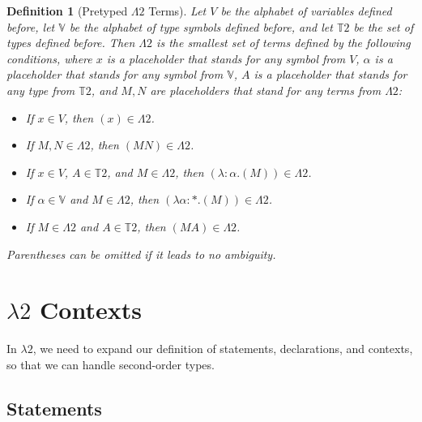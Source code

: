 \documentclass{book}
\numberwithin{equation}{chapter}
\newtheorem{definition}{Definition}
\begin{document}
\begin{definition}[Pretyped $\Lambda 2$ Terms]

  Let $V$ be the alphabet of variables defined before, let $\mathbb{V}$ be the alphabet of type symbols defined before, and let $\mathbb{T}2$ be the set of types defined before. Then $\Lambda 2$ is the smallest set of terms defined by the following conditions, where $x$ is a placeholder that stands for any symbol from $V$, $\alpha$ is a placeholder that stands for any symbol from $\mathbb{V}$, $A$ is a placeholder that stands for any type from $\mathbb{T}2$, and $M, N$ are placeholders that stand for any terms from $\Lambda 2$:

\begin{itemize}

\item{If $x \in V$, then $(x) \in \Lambda 2$.}
\item{If $M, N \in \Lambda 2$, then $(M N) \in \Lambda 2$.}
\item{If $x \in V$, $A \in \mathbb{T}2$, and $M \in \Lambda 2$, then $(\lambda : \alpha.(M)) \in \Lambda 2$.}
\item{If $\alpha \in \mathbb{V}$ and $M \in \Lambda 2$, then $(\lambda \alpha : *.(M)) \in \Lambda 2$.}
\item{If $M \in \Lambda 2$ and $A \in \mathbb{T}2$, then $(M A) \in \Lambda 2$.}

\end{itemize}

\noindent
Parentheses can be omitted if it leads to no ambiguity.

\end{definition}



\chapter{$\lambda2$ Contexts}

In $\lambda 2$, we need to expand our definition of statements, declarations, and contexts, so that we can handle second-order types.

\section{Statements}
\end{document}

